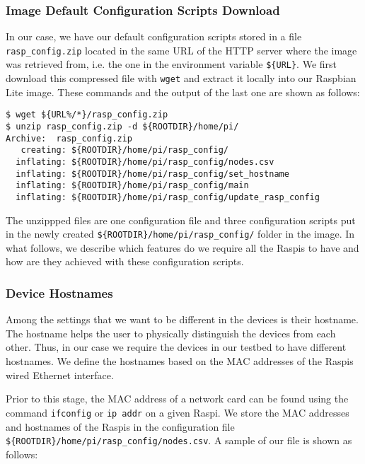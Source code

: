 \subsubsection{Image Default Configuration Scripts Download}
\label{sec:configuration_files_download}
In our case, we have our default configuration scripts stored in a
file \texttt{rasp\_config.zip} located in the same \ac{URL} of the
\ac{HTTP} server where the image was retrieved from, i.e. the one in
the environment variable \texttt{\$\{URL\}}. We first download
this compressed file with \texttt{wget} and extract it locally into our
Raspbian Lite image. These commands and the output of the last one are
shown as follows:

\begin{lstlisting}[]
$ wget ${URL%/*}/rasp_config.zip
$ unzip rasp_config.zip -d ${ROOTDIR}/home/pi/
Archive:  rasp_config.zip
   creating: ${ROOTDIR}/home/pi/rasp_config/
  inflating: ${ROOTDIR}/home/pi/rasp_config/nodes.csv
  inflating: ${ROOTDIR}/home/pi/rasp_config/set_hostname
  inflating: ${ROOTDIR}/home/pi/rasp_config/main
  inflating: ${ROOTDIR}/home/pi/rasp_config/update_rasp_config
\end{lstlisting}
\FloatBarrier
\vspace{-5mm}

The unzippped files are one configuration file and three configuration
scripts put in the newly created \texttt{\$\{ROOTDIR\}/home/pi/rasp\_config/}
folder in the image. In what follows, we describe which features do we
require all the \ac{Raspi}s to have and how are they achieved with
these configuration scripts.

\subsubsection{Device Hostnames}
Among the settings that we want to be different in the devices is
their hostname. The hostname helps the user to physically distinguish the
devices from each other. Thus, in our case we require the devices in our
testbed to have different hostnames. We define the hostnames based
on the \ac{MAC} addresses of the \ac{Raspi}s wired Ethernet interface.

Prior to this stage, the \ac{MAC} address of a network card can be found
using the command \texttt{ifconfig} or \texttt{ip addr} on a given
\ac{Raspi}. We store the \ac{MAC} addresses and hostnames of the
\ac{Raspi}s in the configuration file
\texttt{\$\{ROOTDIR\}/home/pi/rasp\_config/nodes.csv}. A sample of our file
is shown as follows:

